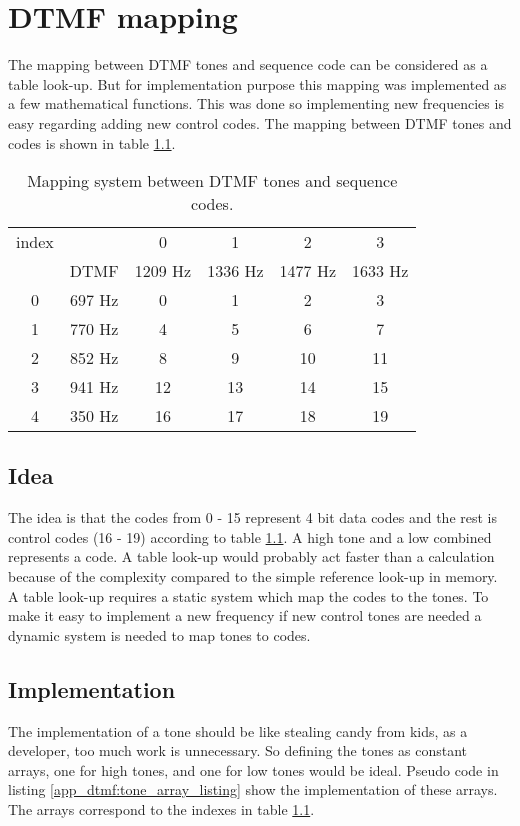 \chapter{DTMF mapping}\label{app:physical_encode}
The mapping between DTMF tones and sequence code can be considered as a table look-up. But for implementation purpose this mapping was implemented as a few mathematical functions. This was done so implementing new frequencies is easy regarding adding new control codes. The mapping between DTMF tones and codes is shown in table \ref{app_dtmf:DTMF_mapping_table}.

\begin{table}[!h]
	\begin{center}
		\begin{tabular}{c c|c c c c}
 		index & & 0 & 1 & 2 & 3 \\
		& DTMF & 1209 Hz & 1336 Hz & 1477 Hz & 1633 Hz \\
		\hline
		0 & 697 Hz & 0 & 1 & 2 & 3 \\
		1 & 770 Hz & 4 & 5 & 6 & 7 \\
		2 & 852 Hz & 8 & 9 & 10 & 11 \\
		3 & 941 Hz & 12 & 13 & 14 & 15 \\
		4 & 350 Hz & 16 & 17 & 18 & 19 \\
		\end{tabular}
	\end{center}
	\caption{Mapping system between DTMF tones and sequence codes.}
	\label{app_dtmf:DTMF_mapping_table}
\end{table}

	\section{Idea}
	The idea is that the codes from 0 - 15 represent 4 bit data codes and the rest is control codes (16 - 19) according to table \ref{app_dtmf:DTMF_mapping_table}. A high tone and a low combined represents a code. A table look-up would probably act faster than a calculation because of the complexity compared to the simple reference look-up in memory. A table look-up requires a static system which map the codes to the tones. To make it easy to implement a new frequency if new control tones are needed a dynamic system is needed to map tones to codes.
	
	\section{Implementation}
	The implementation of a tone should be like stealing candy from kids, as a developer, too much work is unnecessary. So defining the tones as constant arrays, one for high tones, and one for low tones would be ideal. Pseudo code in listing \ref{app_dtmf:tone_array_listing} show the implementation of these arrays. The arrays correspond to the indexes in table \ref{app_dtmf:DTMF_mapping_table}.
	
